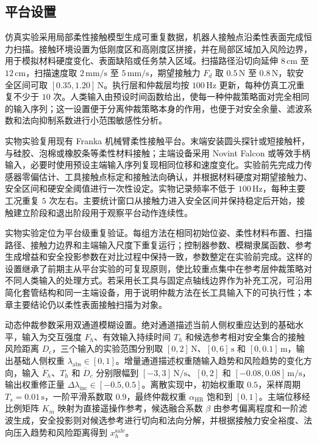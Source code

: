 \subsection{平台设置}
\label{subsec:ch4_platform_setting}

仿真实验采用局部柔性接触模型生成可重复数据，机器人接触点沿柔性表面完成恒力扫描。接触环境设置为低刚度区和高刚度区拼接，并在局部区域加入风险边界，用于模拟材料硬度变化、表面缺陷或任务禁入区域。扫描路径沿切向延伸 $8\,\mathrm{cm}$ 至 $12\,\mathrm{cm}$，扫描速度取 $2\,\mathrm{mm/s}$ 至 $5\,\mathrm{mm/s}$，期望接触力 $F_d$ 取 $0.5\,\mathrm{N}$ 至 $0.8\,\mathrm{N}$，软安全区间可取 $[0.35,1.20]\,\mathrm{N}$。执行层和仲裁层均按 $100\,\mathrm{Hz}$ 更新，每种仿真工况重复不少于 $10$ 次。人类输入由预设时间函数给出，使每一种仲裁策略面对完全相同的输入序列；这一设置便于分离仲裁策略本身的作用，也便于对安全余量、滤波系数和法向抑制系数进行小范围敏感性分析。

实物实验复用现有 Franka 机械臂柔性接触平台。末端安装圆头探针或短接触杆，与硅胶、泡棉或橡胶条等柔性材料接触；主端设备采用 Novint Falcon 或等效手柄输入，必要时使用预设主端输入序列复现相同位移和速度变化。实验前先完成力传感器零偏估计、工具接触点标定和接触法向确认，并根据材料硬度对期望接触力、安全区间和硬安全阈值进行一次性设定。实物记录频率不低于 $100\,\mathrm{Hz}$，每种主要工况重复 $5$ 次左右。主要统计窗口从接触力进入安全区间并保持稳定后开始，接触建立阶段和退出阶段用于观察平台动作连续性。

实物实验定位为平台级重复验证。每组方法在相同初始位姿、柔性材料布置、扫描路径、接触力边界和主端输入尺度下重复运行；控制器参数、模糊隶属函数、参考生成增益和安全投影参数在对比过程中保持一致，参数整定在实验前完成。这样的设置继承了前期主从平台实验的可复现原则，使比较重点集中在参考层仲裁策略对不同人类输入的处理方式。若采用长工具与固定点轴线边界作为补充工况，可沿用简化套管结构和同一主端设备，用于说明仲裁方法在长工具输入下的可执行性；本章主要结论仍以柔性表面接触扫描为对象。

动态仲裁参数采用双通道模糊设置。绝对通道描述当前人侧权重应达到的基础水平，输入为交互强度 $F_h$、有效输入持续时间 $T_h$ 和候选参考相对安全集合的接触风险距离 $D_c$，三个输入的实验范围分别取 $[0,2]\,\mathrm{N}$、$[0,6]\,\mathrm{s}$ 和 $[0,0.1]\,\mathrm{m}$，输出基础人侧权重 $\lambda_{\mathrm{abs}}\in[0,1]$。增量通道描述权重随输入趋势和风险趋势的变化方向，输入 $\dot F_h$、$\dot T_h$ 和 $\dot D_c$ 分别限幅到 $[-3,3]\,\mathrm{N/s}$、$[0,2]$ 和 $[-0.08,0.08]\,\mathrm{m/s}$，输出权重修正量 $\Delta\lambda_{\mathrm{inc}}\in[-0.5,0.5]$。离散实现中，初始权重取 $0.5$，采样周期 $T_s=0.01\,\mathrm{s}$，一阶平滑系数取 $0.9$，最终仲裁权重 $\alpha_{\mathrm{HR}}$ 饱和到 $[0,1]$。主端位移经比例矩阵 $K_m$ 映射为直接遥操作参考，候选融合系数 $\beta$ 由参考偏离程度和一阶滤波生成，安全投影则对候选参考进行切向和法向分解，并根据接触力安全裕度、法向压入趋势和风险距离得到 $x_h^{\mathrm{safe}}$。

